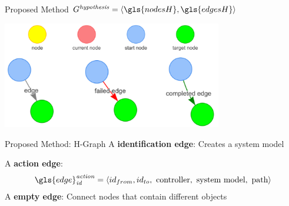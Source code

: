 \begin{frame}[fragile]{Proposed Method} 
$G^\mathit{hypothesis} = \left\langle \gls{nodesH}, \gls{edgesH} \right\rangle $
\vspace{0.5cm}
\begin{center}
\includegraphics[width=9.6cm]{figures/proposed_method/hgraph_legend}
\end{center}
\end{frame}




\begin{frame}[fragile]{Proposed Method: H-Graph} 
A \textbf{identification edge}: Creates a system model\bs

A \textbf{action edge}: \[\gls{edge}^\mathit{action}_\mathit{id} = \left\langle id_{from}, id_{to}, \textrm{ controller},\textrm{ system model}, \textrm{ path} \right\rangle\]\bs
A \textbf{empty edge}: Connect nodes that contain different objects\bs
\end{frame}

